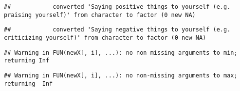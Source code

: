 \documentclass[
]{article}
\begin{document}
\begin{verbatim}
##            converted 'Saying positive things to yourself (e.g. praising yourself)' from character to factor (0 new NA)
\end{verbatim}

\begin{verbatim}
##            converted 'Saying negative things to yourself (e.g. criticizing yourself)' from character to factor (0 new NA)
\end{verbatim}

\begin{verbatim}
## Warning in FUN(newX[, i], ...): no non-missing arguments to min; returning Inf
\end{verbatim}

\begin{verbatim}
## Warning in FUN(newX[, i], ...): no non-missing arguments to max; returning -Inf
\end{verbatim}
\end{document}
